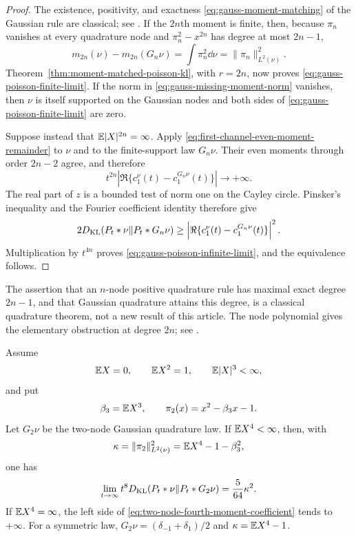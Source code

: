 \begin{proof}
The existence, positivity, and exactness
\eqref{eq:gauss-moment-matching} of the Gaussian rule are classical; see
\cite{GolubWelsch1969GaussQuadrature}.  If the \(2n\)th moment is finite,
then, because \(\pi_n\) vanishes at every quadrature node and
\(\pi_n^2-x^{2n}\) has degree at most \(2n-1\),
\begin{equation}\label{eq:gauss-missing-moment-norm}
 m_{2n}(\nu)-m_{2n}(G_n\nu)
 =\int\pi_n^2\dd\nu=\|\pi_n\|_{L^2(\nu)}^2.
\end{equation}
Theorem~\ref{thm:moment-matched-poisson-kl}, with \(r=2n\), now proves
\eqref{eq:gauss-poisson-finite-limit}.  If the norm in
\eqref{eq:gauss-missing-moment-norm} vanishes, then \(\nu\) is itself
supported on the Gaussian nodes and both sides of
\eqref{eq:gauss-poisson-finite-limit} are zero.

Suppose instead that \(\mathbb{E}|X|^{2n}=\infty\).  Apply
\eqref{eq:first-channel-even-moment-remainder} to \(\nu\) and to the
finite-support law \(G_n\nu\).  Their even moments through order \(2n-2\)
agree, and therefore
\[
 t^{2n}\left|\Re\{c_1^\nu(t)-c_1^{G_n\nu}(t)\}\right|
 \longrightarrow+\infty.
\]
The real part of \(z\) is a bounded test of norm one on the Cayley circle.
Pinsker's inequality and the Fourier coefficient identity therefore give
\[
 2D_{\rm KL}(P_t*\nu\|P_t*G_n\nu)
 \ge\left|\Re\{c_1^\nu(t)-c_1^{G_n\nu}(t)\}\right|^2.
\]
Multiplication by \(t^{4n}\) proves
\eqref{eq:gauss-poisson-infinite-limit}, and the equivalence follows.
\end{proof}

\begin{remark}
The assertion that an \(n\)-node positive quadrature rule has maximal exact
degree \(2n-1\), and that Gaussian quadrature attains this degree, is a
classical quadrature theorem, not a new result of this article.  The node
polynomial gives the elementary obstruction at degree \(2n\); see
\cite{GolubWelsch1969GaussQuadrature}.
\end{remark}

\begin{corollary}
\label{cor:two-node-gauss-fourth-moment}
Assume
\[
 \mathbb{E} X=0,\qquad \mathbb{E} X^2=1,\qquad \mathbb{E}|X|^3<\infty,
\]
and put
\[
 \beta_3=\mathbb{E} X^3,\qquad
 \pi_2(x)=x^2-\beta_3x-1.
\]
Let \(G_2\nu\) be the two-node Gaussian quadrature law.  If
\(\mathbb{E} X^4<\infty\), then, with
\[
 \kappa=\|\pi_2\|_{L^2(\nu)}^2
 =\mathbb{E} X^4-1-\beta_3^2,
\]
one has
\begin{equation}\label{eq:two-node-fourth-moment-coefficient}
 \lim_{t\to\infty}t^8D_{\rm KL}(P_t*\nu\|P_t*G_2\nu)
 =\frac5{64}\kappa^2.
\end{equation}
If \(\mathbb{E} X^4=\infty\), the left side of
\eqref{eq:two-node-fourth-moment-coefficient} tends to \(+\infty\).  For a
symmetric law,
\(G_2\nu=(\delta_{-1}+\delta_1)/2\) and
\(\kappa=\mathbb{E} X^4-1\).
\end{corollary}

